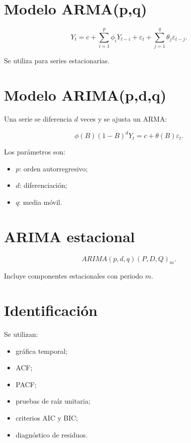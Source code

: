 \documentclass[
  spanish,
  10.5pt,
  letterpaper,
  DIV=11,
  numbers=noendperiod,
  oneside,
  open=any]{scrreprt}
\providecommand{\tightlist}{%
  \setlength{\itemsep}{0pt}\setlength{\parskip}{0pt}}
\theoremstyle{definition}
\theoremstyle{definition}
\theoremstyle{plain}
\theoremstyle{remark}
\begin{document}
\section*{Modelo ARMA(p,q)}\label{modelo-armapq}


\[
Y_t
=
c+
\sum_{i=1}^{p}\phi_iY_{t-i}
+
\varepsilon_t+
\sum_{j=1}^{q}\theta_j\varepsilon_{t-j}.
\]

Se utiliza para series estacionarias.

\section*{Modelo ARIMA(p,d,q)}\label{modelo-arimapdq}


Una serie se diferencia \(d\) veces y se ajusta un ARMA:

\[
\phi(B)(1-B)^dY_t
=
c+\theta(B)\varepsilon_t.
\]

Los parámetros son:

\begin{itemize}
\tightlist
\item
  \(p\): orden autorregresivo;
\item
  \(d\): diferenciación;
\item
  \(q\): media móvil.
\end{itemize}

\section*{ARIMA estacional}\label{arima-estacional}


\[
ARIMA(p,d,q)(P,D,Q)_m.
\]

Incluye componentes estacionales con periodo \(m\).

\section*{Identificación}\label{identificaciuxf3n}


Se utilizan:

\begin{itemize}
\tightlist
\item
  gráfica temporal;
\item
  ACF;
\item
  PACF;
\item
  pruebas de raíz unitaria;
\item
  criterios AIC y BIC;
\item
  diagnóstico de residuos.
\end{itemize}
\end{document}
